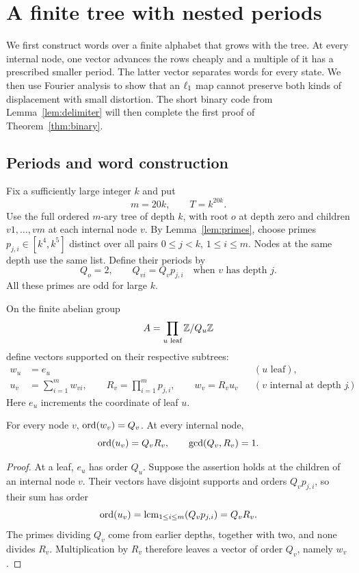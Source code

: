 \section{A finite tree with nested periods}\label{sec:finite}

We first construct words over a finite alphabet that grows with the
tree. At every internal node, one vector advances the rows cheaply and
a multiple of it has a prescribed smaller period. The latter vector
separates words for every state. We then use Fourier analysis to show
that an $\ell_1$ map cannot preserve both kinds of displacement with
small distortion. The short binary code from
Lemma~\ref{lem:delimiter} will then complete the first proof of
Theorem~\ref{thm:binary}.

\subsection{Periods and word construction}

Fix a sufficiently large integer $k$ and put
\begin{equation}\label{eq:finite-parameters}
 m=20k,\qquad T=k^{20k}.
\end{equation}
Use the full ordered $m$-ary tree of depth $k$, with root $o$ at depth
zero and children $v1,\ldots,vm$ at each internal node $v$.
By Lemma~\ref{lem:primes}, choose primes
$p_{j,i}\in[k^4,k^5]$ distinct over all pairs
$0\leq j<k$, $1\leq i\leq m$. Nodes at the same depth use the same
list. Define their periods by
\[
 Q_o=2,\qquad Q_{vi}=Q_vp_{j,i}
 \quad\text{when $v$ has depth $j$}.
\]
All these primes are odd for large $k$.

On the finite abelian group
\[
 A=\prod_{u\text{ leaf}}\mathbb Z/Q_u\mathbb Z
\]
define vectors supported on their respective subtrees:
\begin{equation}\label{eq:finite-vectors}
 \begin{aligned}
 w_u&=e_u &&(u\text{ leaf}),\\
 u_v&=\sum_{i=1}^m w_{vi},\qquad
 R_v=\prod_{i=1}^m p_{j,i},\qquad
 w_v=R_vu_v
 &&(v\text{ internal at depth }j).
 \end{aligned}
\end{equation}
Here $e_u$ increments the coordinate of leaf $u$.

\begin{lemma}\label{lem:orders}
For every node $v$, $\operatorname{ord}(w_v)=Q_v$. At every internal node,
\[
 \operatorname{ord}(u_v)=Q_vR_v,\qquad \gcd(Q_v,R_v)=1.
\]
\end{lemma}
\begin{proof}
At a leaf, $e_u$ has order $Q_u$. Suppose the assertion holds at the
children of an internal node $v$. Their vectors have disjoint supports
and orders $Q_vp_{j,i}$, so their sum has order
\[
 \operatorname{ord}(u_v)=\operatorname{lcm}_{1\leq i\leq m}(Q_vp_{j,i})=Q_vR_v.
\]
The primes dividing $Q_v$ come from earlier depths, together with two,
and none divides $R_v$. Multiplication by $R_v$ therefore leaves a
vector of order $Q_v$, namely $w_v$.
\end{proof}

